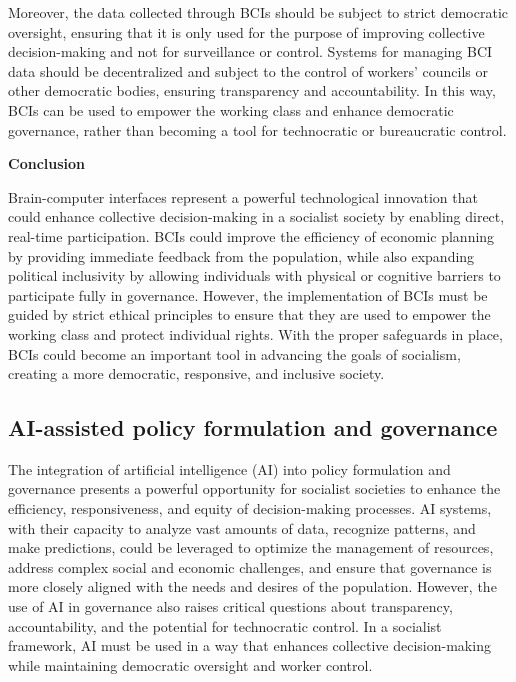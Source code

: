\begin{refsection}
Moreover, the data collected through BCIs should be subject to strict democratic oversight, ensuring that it is only used for the purpose of improving collective decision-making and not for surveillance or control. Systems for managing BCI data should be decentralized and subject to the control of workers’ councils or other democratic bodies, ensuring transparency and accountability. In this way, BCIs can be used to empower the working class and enhance democratic governance, rather than becoming a tool for technocratic or bureaucratic control.

\textbf{Conclusion}

Brain-computer interfaces represent a powerful technological innovation that could enhance collective decision-making in a socialist society by enabling direct, real-time participation. BCIs could improve the efficiency of economic planning by providing immediate feedback from the population, while also expanding political inclusivity by allowing individuals with physical or cognitive barriers to participate fully in governance. However, the implementation of BCIs must be guided by strict ethical principles to ensure that they are used to empower the working class and protect individual rights. With the proper safeguards in place, BCIs could become an important tool in advancing the goals of socialism, creating a more democratic, responsive, and inclusive society.

\subsection{AI-assisted policy formulation and governance}

The integration of artificial intelligence (AI) into policy formulation and governance presents a powerful opportunity for socialist societies to enhance the efficiency, responsiveness, and equity of decision-making processes. AI systems, with their capacity to analyze vast amounts of data, recognize patterns, and make predictions, could be leveraged to optimize the management of resources, address complex social and economic challenges, and ensure that governance is more closely aligned with the needs and desires of the population. However, the use of AI in governance also raises critical questions about transparency, accountability, and the potential for technocratic control. In a socialist framework, AI must be used in a way that enhances collective decision-making while maintaining democratic oversight and worker control.


\end{refsection}
